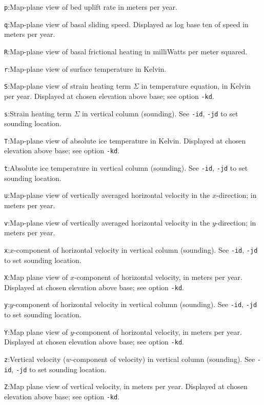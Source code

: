 \documentclass[11pt,final]{amsart}
\begin{document}
\verb|p|:\quad Map-plane view of bed uplift rate in meters per year.

\verb|q|:\quad Map-plane view of basal sliding speed.  Displayed as log base ten of speed in meters per year.

\verb|R|:\quad Map-plane view of basal frictional heating in milliWatts per meter squared.

\verb|r|:\quad Map-plane view of surface temperature in Kelvin.

\verb|S|:\quad Map-plane view of strain heating term $\Sigma$ in temperature equation, in Kelvin per year.  Displayed at chosen elevation above base; see option \verb|-kd|.

\verb|s|:\quad Strain heating term $\Sigma$ in vertical column (sounding).  See \verb|-id|, \verb|-jd| to set sounding location.

\verb|T|:\quad Map-plane view of absolute ice temperature in Kelvin.  Displayed at chosen elevation above base; see option \verb|-kd|.

\verb|t|:\quad Absolute ice temperature in vertical column (sounding).  See \verb|-id|, \verb|-jd| to set sounding location.

\verb|u|:\quad Map-plane view of vertically averaged horizontal velocity in the $x$-direction;  in meters per year.

\verb|v|:\quad Map-plane view of vertically averaged horizontal velocity in the $y$-direction;  in meters per year.

\verb|x|:\quad $x$-component of horizontal velocity in vertical column (sounding).  See \verb|-id|, \verb|-jd| to set sounding location.

\verb|X|:\quad Map plane view of $x$-component of horizontal velocity, in meters per year.  Displayed at chosen elevation above base; see option \verb|-kd|.

\verb|y|:\quad $y$-component of horizontal velocity in vertical column (sounding).  See \verb|-id|, \verb|-jd| to set sounding location.

\verb|Y|:\quad Map plane view of $y$-component of horizontal velocity, in meters per year.  Displayed at chosen elevation above base; see option \verb|-kd|.

\verb|z|:\quad Vertical velocity ($w$-component of velocity) in vertical column (sounding).  See \verb|-id|, \verb|-jd| to set sounding location.

\verb|Z|:\quad Map plane view of vertical velocity, in meters per year.  Displayed at chosen elevation above base; see option \verb|-kd|.


\end{document}
